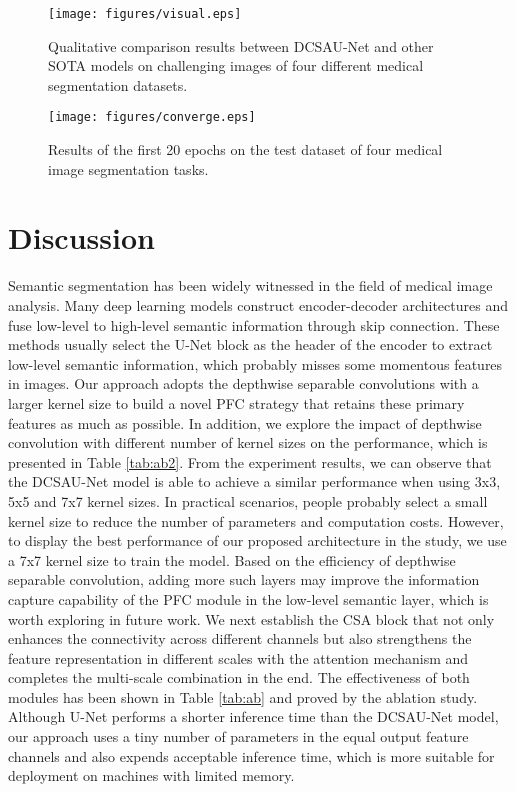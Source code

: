 \documentclass[a4paper,fleqn]{cas-dc}
\begin{document}
\begin{figure*}
  \centering
  \texttt{[image: figures/visual.eps]}
  \caption{ Qualitative comparison results between DCSAU-Net and other  SOTA models on challenging images of four different medical segmentation datasets.}
  \label{fig:visual}
\end{figure*}

\begin{figure*}
  \centering
  \texttt{[image: figures/converge.eps]}
  \caption{ Results of the first 20 epochs on the test dataset of four medical image segmentation tasks.}
  \label{fig:converge}
\end{figure*}


\section{Discussion}
\label{sec:discussion}
Semantic segmentation has been widely witnessed in the field of medical image analysis. Many deep learning models construct encoder-decoder architectures and fuse low-level to high-level semantic information through skip connection. These methods usually select the U-Net \cite{ronneberger2015u} block as the header of the encoder to extract low-level semantic information, which probably misses some momentous features in images. Our approach adopts the depthwise separable convolutions with a larger kernel size to build a novel PFC strategy that retains these primary features as much as possible. In addition, we explore the impact of depthwise convolution with different number of kernel sizes on the performance, which is presented in Table \ref{tab:ab2}. From the experiment results, we can observe that the DCSAU-Net model is able to achieve a similar performance when using 3x3, 5x5 and 7x7 kernel sizes. In practical scenarios, people probably select a small kernel size to reduce the number of parameters and computation costs. However, to display the best performance of our proposed architecture in the study, we use a 7x7 kernel size to train the model. Based on the efficiency of depthwise separable convolution, adding more such layers may improve the information capture capability of the PFC module in the low-level semantic layer, which is worth exploring in future work. We next establish the CSA block that not only enhances the connectivity across different channels but also strengthens the feature representation in different scales with the attention mechanism and completes the multi-scale combination in the end. The effectiveness of both modules has been shown in Table \ref{tab:ab} and proved by the ablation study. Although U-Net performs a shorter inference time than the DCSAU-Net model, our approach uses a tiny number of parameters in the equal output feature channels and also expends acceptable inference time, which is more suitable for deployment on machines with limited memory.   
\end{document}
